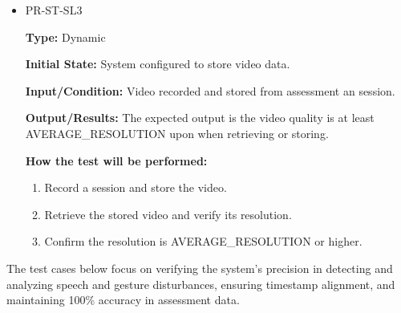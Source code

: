 \documentclass[12pt, titlepage]{article}
\begin{document}
\begin{itemize}
\begin{mdframed}[linewidth=0.5mm]
\begin{enumerate}[noitemsep]
      \end{enumerate}
  \end{mdframed}
  \item PR-ST-SL3
  \begin{mdframed}[linewidth=0.5mm]
      \textbf{Type:} Dynamic \par
      \textbf{Initial State:} System configured to store video data. \par
      \textbf{Input/Condition:} Video recorded and stored from assessment an session. \par
      \textbf{Output/Results:} The expected output is the video quality is at least \\AVERAGE\_RESOLUTION upon when retrieving or storing. \par
      \textbf{How the test will be performed:}
      \begin{enumerate}[noitemsep]
        \item Record a session and store the video.
        \item Retrieve the stored video and verify its resolution.
        \item Confirm the resolution is AVERAGE\_RESOLUTION or higher.
      \end{enumerate}
  \end{mdframed}
\end{itemize}

\hspace{2em}The test cases below focus on verifying the system's precision in detecting and 
analyzing speech and gesture disturbances, ensuring timestamp alignment, and maintaining 
100\% accuracy in assessment data. 
\end{document}
